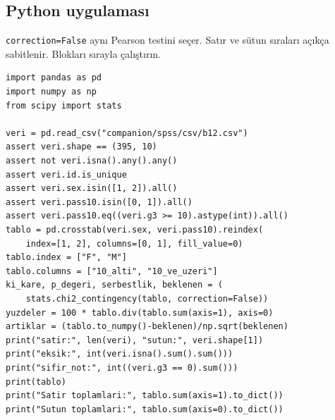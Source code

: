 \par\noindent\begin{minipage}{\linewidth}
\subsection{Python uygulaması}
\label{sec:python-b12}

\texttt{correction=False} aynı Pearson testini seçer. Satır ve
sütun sıraları açıkça sabitlenir. Blokları sırayla çalıştırın.

\begin{lstlisting}[style=prismPythonApp]
import pandas as pd
import numpy as np
from scipy import stats

veri = pd.read_csv("companion/spss/csv/b12.csv")
assert veri.shape == (395, 10)
assert not veri.isna().any().any()
assert veri.id.is_unique
assert veri.sex.isin([1, 2]).all()
assert veri.pass10.isin([0, 1]).all()
assert veri.pass10.eq((veri.g3 >= 10).astype(int)).all()
tablo = pd.crosstab(veri.sex, veri.pass10).reindex(
    index=[1, 2], columns=[0, 1], fill_value=0)
tablo.index = ["F", "M"]
tablo.columns = ["10_alti", "10_ve_uzeri"]
ki_kare, p_degeri, serbestlik, beklenen = (
    stats.chi2_contingency(tablo, correction=False))
yuzdeler = 100 * tablo.div(tablo.sum(axis=1), axis=0)
artiklar = (tablo.to_numpy()-beklenen)/np.sqrt(beklenen)
print("satir:", len(veri), "sutun:", veri.shape[1])
print("eksik:", int(veri.isna().sum().sum()))
print("sifir_not:", int((veri.g3 == 0).sum()))
print(tablo)
print("Satir toplamlari:", tablo.sum(axis=1).to_dict())
print("Sutun toplamlari:", tablo.sum(axis=0).to_dict())
\end{lstlisting}
\end{minipage}\par

